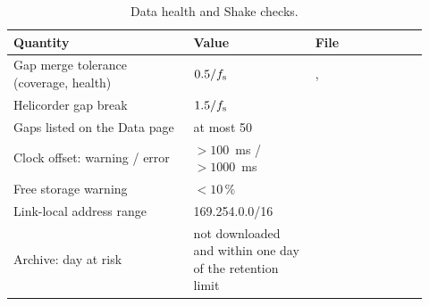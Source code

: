 \begin{table}[tbp]
\centering\small
\caption{Data health and Shake checks.}\label{tab:paramC}
\begin{tabular}{@{}L{0.40\linewidth}L{0.27\linewidth}L{0.25\linewidth}@{}}
\toprule
Quantity & Value & File\\ \midrule
Gap merge tolerance (coverage, health) & $0.5/f_{\mathrm{s}}$ & , \\
Helicorder gap break & $1.5/f_{\mathrm{s}}$ & \\
Gaps listed on the Data page & at most 50 & \\
Clock offset: warning / error & $>100$~ms / $>1000$~ms & \\
Free storage warning & $<10\,\%$ & \\
Link-local address range & 169.254.0.0/16 & \\
Archive: day at risk & not downloaded and within one day of the retention limit & \\
\bottomrule
\end{tabular}
\end{table}
